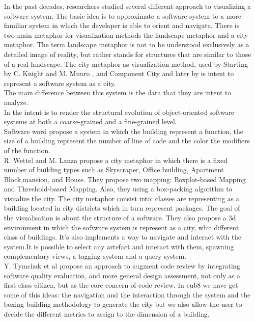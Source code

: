 \documentclass[]{usiinfbachelorproject}
\begin{document}
In the past decades, researchers studied several different approach to visualizing a software system.
The basic idea is to approximate a software system to a more familiar system in which the developer is able to orient and navigate. 
There is two main metaphor for visualization methods the landscape metaphor and a city metaphor. The term landscape metaphor is not to be understood exclusively as a detailed image of reality, but rather stands for structures that are similar to those of a real landscape\cite{LS}.
The city metaphor as visualization method, used by   Starting  by C. Knight and M. Munro \cite{SoftwareWorld}, and Component City \cite{IDM} and later by \cite{vssac} \cite{programComp} is intent to represent a software system as a city.\\
 The main difference between this system is the data that they are intent to analyze.\\
 In \cite{Evolution}  the intent is to render the structural evolution of object-oriented software systems at both a coarse-grained and a fine-grained level.\\
 Software word \cite{SoftwareWorld} propose a system in which the building represent a function, the size of a building represent the number of line of code and the color the modifiers of the function.\\
 R. Wettel and M. Lanza \cite{programComp} propose a city metaphor in which there is a fixed number  of building types such as Skyscraper, Office building, Apartment Block,mansion, and House. They propose two mapping: Boxplot-based Mapping and Threshold-based Mapping. Also, they using a box-packing algorithm to visualize the city. The city metaphor consist into: classes are representing as a building located in city districts which in turn represent packages. The goal of the visualisation is about the structure of a software. They  \cite{vssac} also propose a 3d environment in which the software system is represent as a city, whit different class of buildings. It's also implements a way to navigate and interact with the system.It is possible to select any artefact and interact with them, spawning complementary views,  a tagging system and a query system.\\
Y. Tymchuk et al \cite{VVV} propose an approach to augment code review by integrating software quality evaluation, and more general design assessment, not only as a first class citizen, but as the core concern of code review.
In cub8 we have  get some of this ideas: the navigation and the interaction through the system and the boxing building methodology to generate the city but we also allow the user to decide the different metrics to assign to the dimension of a building.  \\
\end{document}
